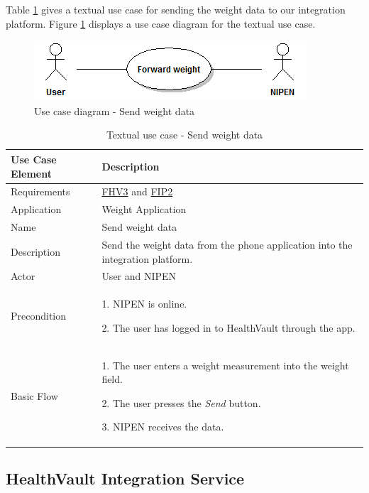 Table \ref{table:use-case-send-weight-data} gives a textual use case for sending the weight data to our integration platform. 
Figure \ref{figure:use-case-diagram-send-weight} displays a use case diagram for the textual use case.

\begin{figure}[H]
\centering
\includegraphics[scale=0.75]{../Figures/use-case-diagram-send-weight.png}
\caption{Use case diagram - Send weight data}
\label{figure:use-case-diagram-send-weight}
\end{figure}

\begin{table}[H]
\begin{center}
\begin{tabular}{ l | p{10cm} }
  \hline
  \textbf{Use Case Element} & \textbf{Description} \\ \hline\hline
  Requirements & \hyperref[table:reqweight]{FHV3} and \hyperref[table:reqip]{FIP2}\\ \hline
  Application & Weight Application \\ \hline
  Name & Send weight data \\ \hline
  Description & Send the weight data from the phone application into the integration platform. \\ \hline
  Actor & User and NIPEN \\ \hline
  Precondition &
    \par 1. NIPEN is online.
    \par 2. The user has logged in to HealthVault through the app.
  \\ \hline
  Basic Flow & 
    \par 1. The user enters a weight measurement into the weight field.
  	\par 2. The user presses the \textit{Send} button.
  	\par 3. NIPEN receives the data.
  \\ \hline
\end{tabular}
\end{center}
\caption{Textual use case - Send weight data}
\label{table:use-case-send-weight-data}
\end{table}

\subsection{HealthVault Integration Service}

